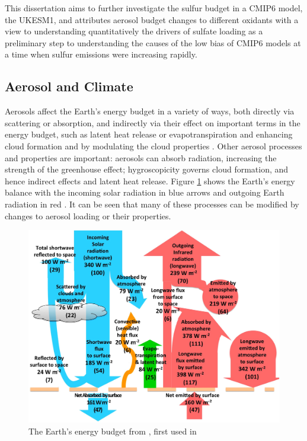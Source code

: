 This dissertation aims to further investigate the sulfur budget in a CMIP6 model, the UKESM1, and attributes aerosol budget changes to different oxidants with a view to understanding quantitatively the drivers of sulfate loading as a preliminary step to understanding the causes of the low bias of CMIP6 models at a time when sulfur emissions were increasing rapidly. 


\subsection{Aerosol and Climate} %

Aerosols affect the Earth’s energy budget in a variety of ways, both directly via scattering or absorption, and indirectly via their effect on important terms in the energy budget, such as latent heat release or evapotranspiration and enhancing cloud formation and by modulating the cloud properties \citep{readGlobalEnergyBudgets2016}.  Other aerosol processes and properties are important: aerosols can absorb radiation, increasing the strength of the greenhouse effect; hygroscopicity governs cloud formation, and hence indirect effects and latent heat release. Figure \ref{fig:trenberth} shows the Earth's energy balance with the incoming solar radiation in blue arrows and outgoing Earth radiation in red \citep{kiehlEarthAnnualGlobal1997}.  It can be seen that many of these processes can be modified by changes to aerosol loading or their properties. 

\begin{figure}
    \centering
    \includegraphics[width=0.7\columnwidth]{Chapter1/figs/01_trenberth.jpg}
    \caption[The Earth’s energy budget]{The Earth’s energy budget from \citet{readGlobalEnergyBudgets2016}, first used in \citet{kiehlEarthAnnualGlobal1997}}
    \label{fig:trenberth}
\end{figure}


